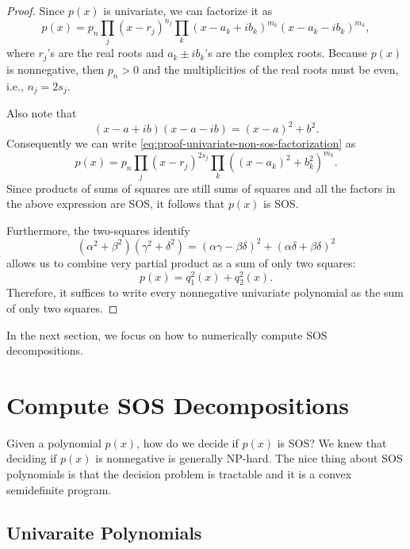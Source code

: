 \documentclass[
]{book}
\theoremstyle{definition}
\theoremstyle{definition}
\theoremstyle{definition}
\theoremstyle{definition}
\theoremstyle{remark}
\begin{document}
\begin{proof}
Since \(p(x)\) is univariate, we can factorize it as
\begin{equation}
p(x) = p_n \prod_j (x - r_j)^{n_j} \prod_{k} (x - a_k + i b_k)^{m_k} (x - a_k - i b_k)^{m_k},
\label{eq:proof-univariate-non-sos-factorization}
\end{equation}
where \(r_j\)'s are the real roots and \(a_k \pm i b_k\)'s are the complex roots. Because \(p(x)\) is nonnegative, then \(p_n > 0\) and the multiplicities of the real roots must be even, i.e., \(n_j = 2 s_j\).

Also note that
\[
(x - a + ib)(x - a - ib) = (x-a)^2 + b^2.
\]
Consequently we can write \eqref{eq:proof-univariate-non-sos-factorization} as
\[
p(x) = p_n \prod_j (x - r_j)^{2 s_j} \prod_k ((x-a_k)^2 + b_k^2)^{m_k}.
\]
Since products of sums of squares are still sums of squares and all the factors in the above expression are SOS, it follows that \(p(x)\) is SOS.

Furthermore, the two-squares identify
\[
(\alpha^2 + \beta^2)(\gamma^2 + \delta^2) = (\alpha \gamma - \beta \delta)^2 + (\alpha \delta + \beta \delta)^2
\]
allows us to combine very partial product as a sum of only two squares:
\[
p(x) = q_1^2(x) + q_2^2(x).
\]
Therefore, it suffices to write every nonnegative univariate polynomial as the sum of only two squares.
\end{proof}

In the next section, we focus on how to numerically compute SOS decompositions.

\section{Compute SOS Decompositions}\label{compute-sos-decompositions}

Given a polynomial \(p(x)\), how do we decide if \(p(x)\) is SOS? We knew that deciding if \(p(x)\) is nonnegative is generally NP-hard. The nice thing about SOS polynomials is that the decision problem is tractable and it is a convex semidefinite program.

\subsection{Univaraite Polynomials}\label{univaraite-polynomials}
\end{document}
